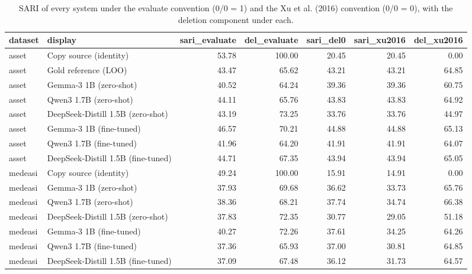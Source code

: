 \begin{table}
\caption{SARI of every system under the evaluate convention (0/0 = 1) and the Xu et al. (2016) convention (0/0 = 0), with the deletion component under each.}
\label{tab:sari_conventions}
\begin{tabular}{llrrrrr}
\toprule
dataset & display & sari_evaluate & del_evaluate & sari_del0 & sari_xu2016 & del_xu2016 \\
\midrule
asset & Copy source (identity) & 53.78 & 100.00 & 20.45 & 20.45 & 0.00 \\
asset & Gold reference (LOO) & 43.47 & 65.62 & 43.21 & 43.21 & 64.85 \\
asset & Gemma-3 1B (zero-shot) & 40.52 & 64.24 & 39.36 & 39.36 & 60.75 \\
asset & Qwen3 1.7B (zero-shot) & 44.11 & 65.76 & 43.83 & 43.83 & 64.92 \\
asset & DeepSeek-Distill 1.5B (zero-shot) & 43.19 & 73.25 & 33.76 & 33.76 & 44.97 \\
asset & Gemma-3 1B (fine-tuned) & 46.57 & 70.21 & 44.88 & 44.88 & 65.13 \\
asset & Qwen3 1.7B (fine-tuned) & 41.96 & 64.20 & 41.91 & 41.91 & 64.07 \\
asset & DeepSeek-Distill 1.5B (fine-tuned) & 44.71 & 67.35 & 43.94 & 43.94 & 65.05 \\
medeasi & Copy source (identity) & 49.24 & 100.00 & 15.91 & 14.91 & 0.00 \\
medeasi & Gemma-3 1B (zero-shot) & 37.93 & 69.68 & 36.62 & 33.73 & 65.76 \\
medeasi & Qwen3 1.7B (zero-shot) & 38.36 & 68.21 & 37.74 & 34.74 & 66.38 \\
medeasi & DeepSeek-Distill 1.5B (zero-shot) & 37.83 & 72.35 & 30.77 & 29.05 & 51.18 \\
medeasi & Gemma-3 1B (fine-tuned) & 40.27 & 72.26 & 37.61 & 34.25 & 64.26 \\
medeasi & Qwen3 1.7B (fine-tuned) & 37.36 & 65.93 & 37.00 & 30.81 & 64.85 \\
medeasi & DeepSeek-Distill 1.5B (fine-tuned) & 37.09 & 67.48 & 36.12 & 31.73 & 64.57 \\
\bottomrule
\end{tabular}
\end{table}
